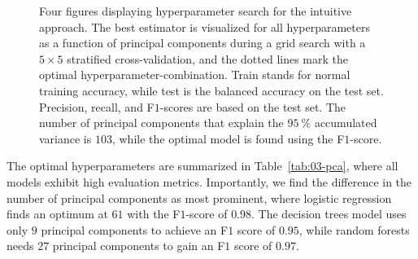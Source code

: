 \documentclass[superscriptaddress,unsortedaddress,
 amsmath,amssymb,
 aps,
]{revtex4-2}
\begin{document}
\begin{figure}[ht!]
  \begin{subfigure}[b]{1.0\textwidth}
    \centering
    
  \end{subfigure}
  \par\bigskip
  \begin{subfigure}[b]{0.5\textwidth}
    
    \caption{}
    \label{fig:q3-LOG}
  \end{subfigure}%
  \hfill
  \begin{subfigure}[b]{0.5\textwidth}
    
    \caption{}
    \label{fig:q3-DT}
  \end{subfigure}
  \begin{subfigure}[b]{0.5\textwidth}
    
    \caption{}
    \label{fig:q3-RF}
  \end{subfigure}%
  \hfill
  \begin{subfigure}[b]{0.5\textwidth}
    
    \caption{}
    \label{fig:q3-GB}
  \end{subfigure}

  \caption{{Four figures displaying hyperparameter search for the intuitive approach. The best estimator is visualized for all hyperparameters as a function of principal components during a grid search with a $5\times5$ stratified cross-validation, and the dotted lines mark the optimal hyperparameter-combination. Train stands for normal training accuracy, while test is the balanced accuracy on the test set. Precision, recall, and F$1$-scores are based on the test set. The number of principal components that explain the $95 \ \%$ accumulated variance is $103$, while the optimal model is found using the F$1$-score.}}
  \label{fig:03-pca}
\end{figure}

The optimal hyperparameters are summarized in Table~\ref{tab:03-pca}, where all models exhibit high evaluation metrics. Importantly, we find the difference in the number of principal components as most prominent, where logistic regression finds an optimum at $61$ with the F$1$-score of $0.98$. The decision trees model uses only $9$ principal components to achieve an F$1$ score of $0.95$, while random forests needs $27$ principal components to gain an F$1$ score of $0.97$.
\end{document}
